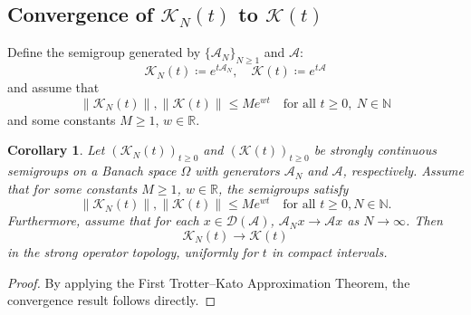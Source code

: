 \documentclass{article}[11]
\newtheorem{corollary}[theorem]{Corollary}
\begin{document}
\subsection{Convergence of \(\mathcal{K}_N(t)\) to \(\mathcal{K}(t)\)}

Define the semigroup generated by $\{\mathcal{A}_N\}_{N \geq 1}$ and $\mathcal{A}$:
$$
\mathcal{K}_N(t) \coloneqq e^{t\mathcal{A}_N}, \quad \mathcal{K}(t) \coloneqq e^{t\mathcal{A}}
$$
and assume that 
$$
\|\mathcal{K}_N(t)\|, \|\mathcal{K}(t)\| \leq Me^{wt} \quad \textrm{for all } t\geq0, \  N\in\mathbb{N}
$$
and some constants $M \geq 1$, $w \in \mathbb{R}$.

\begin{corollary}
	Let $(\mathcal{K}_N(t))_{t\geq0}$ and $(\mathcal{K}(t))_{t\geq0}$ be strongly continuous semigroups on a Banach space $\Omega$ with generators $\mathcal{A}_N$ and $\mathcal{A}$, respectively. Assume that for some constants $M \geq 1$, $w \in \mathbb{R}$, the semigroups satisfy
	\[
	\|\mathcal{K}_N(t)\|, \|\mathcal{K}(t)\| \leq Me^{wt} \quad \text{for all } t \geq 0, N \in \mathbb{N}.
	\]
	Furthermore, assume that for each $x \in \mathcal{D}(\mathcal{A})$, $\mathcal{A}_N x \to \mathcal{A} x$ as $N \to \infty$. Then 
	$$
	\mathcal{K}_N(t) \to \mathcal{K}(t)
	$$
	in the strong operator topology, uniformly for $t$ in compact intervals.
\end{corollary}
\begin{proof}
	By applying the First Trotter--Kato Approximation Theorem, the convergence result follows directly.
\end{proof}
	
	
\end{document}
